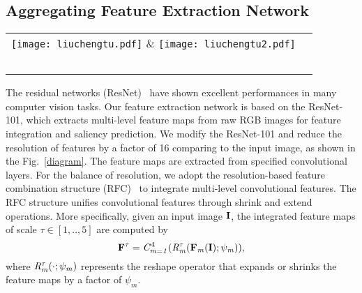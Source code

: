 \documentclass[journal]{IEEEtran}
\begin{document}
\subsection{Aggregating Feature Extraction Network}
\begin{figure*}[!t]
\centering
\begin{tabular}{@{}c@{}c}
\texttt{[image: liuchengtu.pdf]} \&
\texttt{[image: liuchengtu2.pdf]} \\\
\end{tabular}
\caption{
The overall architecture of our proposed BFANet. The upper stream represents the reproduced Amulet~\cite{Zhang2017Amulet}, which is used to extract multi-level convolutional features.
The details of Amulet are described in Section~\ref{sec:AmuletNet for initial prediction}.
In another stream, Boundary Prediction Network (BPN) can progressively enlarge the resolution and refine the details of boundary predictions through a cascaded of residual convolution unit (RCU).
Attention-based feature fusion module (AFFM) is employed to integrate multi-level features and boundary cues.
After that, we obtain multi-level fused feature maps by parallel fused prediction modules (FPM).
The final saliency map is produced with the fused feature maps.
\label{diagram}}
\vspace{-5mm}
\end{figure*}
\label{sec:AmuletNet for initial prediction}
The residual networks (ResNet)~\cite{He2016Deep} have shown excellent performances in many computer vision tasks.
Our feature extraction network is based on the ResNet-101, which extracts multi-level feature maps from raw RGB images for feature integration and saliency prediction.
We modify the ResNet-101 and reduce the resolution of features by a factor of 16 comparing to the input image, as shown in the Fig.~\ref{diagram}.
The feature maps are extracted from specified convolutional layers.
For the balance of resolution, we adopt the resolution-based feature combination structure (RFC)~\cite{Zhang2017Amulet} to integrate multi-level convolutional features.
The RFC structure unifies convolutional features through shrink and extend operations.
More specifically, given an input image $\bf{I}$, the integrated feature maps of scale $\tau\in[1,..,5]$ are computed by
\begin{equation}
\bf{F}^{\tau} = \it{C}_{m=1}^{\text{4}}( \it{R_{m}^{\tau}}(\bf{F}_{\it{m}}(I);\psi_{\it{m}})),
\label{eq:original-bayes}
\end{equation}
where $\it{R_{m}^{\tau}}({\cdot};\psi_{m})$ represents the reshape operator that expands or shrinks the feature maps by a factor of $\psi_{m}$.
\end{document}
